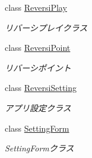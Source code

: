 \begin{DoxyCompactItemize}
class \hyperlink{class_reversi4color_form_1_1_reversi_play}{Reversi\+Play}
\begin{DoxyCompactList}\small\item\em リバーシプレイクラス \end{DoxyCompactList}\item 
class \hyperlink{class_reversi4color_form_1_1_reversi_point}{Reversi\+Point}
\begin{DoxyCompactList}\small\item\em リバーシポイント \end{DoxyCompactList}\item 
class \hyperlink{class_reversi4color_form_1_1_reversi_setting}{Reversi\+Setting}
\begin{DoxyCompactList}\small\item\em アプリ設定クラス \end{DoxyCompactList}\item 
class \hyperlink{class_reversi4color_form_1_1_setting_form}{Setting\+Form}
\begin{DoxyCompactList}\small\item\em Setting\+Formクラス \end{DoxyCompactList}\end{DoxyCompactItemize}
